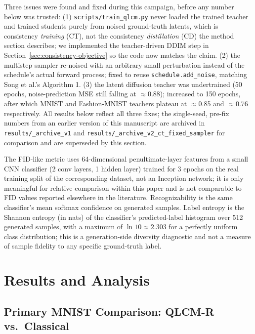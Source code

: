 \documentclass[11pt]{article}
\begin{document}
Three issues were found and fixed during this campaign, before any number
below was trusted: (1) \texttt{scripts/train\_qlcm.py} never loaded the
trained teacher and trained students purely from noised ground-truth latents,
which is consistency \emph{training} (CT), not the consistency
\emph{distillation} (CD) the method section describes; we implemented the
teacher-driven DDIM step in Section~\ref{sec:consistency-objective} so the
code now matches the claim. (2) the multistep sampler re-noised with an
arbitrary small perturbation instead of the schedule's actual forward
process; fixed to reuse \texttt{schedule.add\_noise}, matching Song et al.'s
Algorithm 1. (3) the latent diffusion teacher was undertrained (50 epochs,
noise-prediction MSE still falling at $\approx$0.88); increased to 150
epochs, after which MNIST and Fashion-MNIST teachers plateau at
$\approx$0.85 and $\approx$0.76 respectively. All results below reflect all
three fixes; the single-seed, pre-fix numbers from an earlier version of this
manuscript are archived in \texttt{results/\_archive\_v1} and
\texttt{results/\_archive\_v2\_ct\_fixed\_sampler} for comparison and are
superseded by this section.

The FID-like metric uses 64-dimensional penultimate-layer features from a
small CNN classifier (2 conv layers, 1 hidden layer) trained for 3 epochs on
the real training split of the corresponding dataset, not an Inception
network; it is only meaningful for relative comparison within this paper and
is not comparable to FID values reported elsewhere in the literature.
Recognizability is the same classifier's mean softmax confidence on generated
samples. Label entropy is the Shannon entropy (in nats) of the classifier's
predicted-label histogram over 512 generated samples, with a maximum of
$\ln 10 \approx 2.303$ for a perfectly uniform class distribution; this is a
generation-side diversity diagnostic and not a measure of sample fidelity to
any specific ground-truth label.

\section{Results and Analysis}
\label{sec:results}

\subsection{Primary MNIST Comparison: QLCM-R vs.\ Classical}
\end{document}
